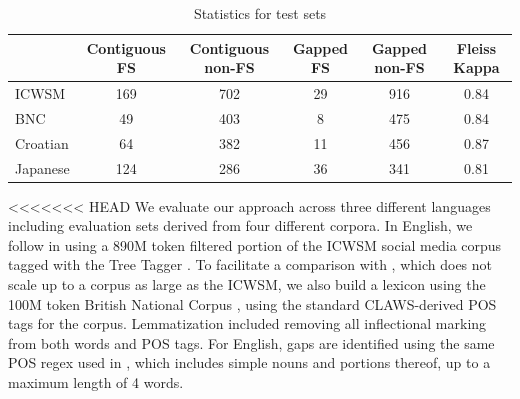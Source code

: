 \documentclass[11pt,letterpaper]{article}
\begin{document}
\begin{table}[!bt]
 
 \begin{center}
  \caption{ Statistics for test sets}
	 \label{tab:stats}
	 \begin{tabular}{lccccc}

       \hline
			& Contiguous FS & Contiguous non-FS & Gapped FS & Gapped non-FS & Fleiss Kappa\\
			 \hline
			ICWSM & 169 & 702 & 29 & 916& 0.84 \\
			BNC & 49 & 403 & 8 & 475 & 0.84 \\
			Croatian & 64 & 382 & 11 & 456 & 0.87 \\
			Japanese & 124 & 286 & 36 & 341 & 0.81\\
       \hline
 \end{tabular}

 \end{center}

 \end{table}	


<<<<<<< HEAD
We evaluate our approach across three different languages including evaluation sets derived from four different corpora. In English, we follow  in using a 890M token filtered portion of the ICWSM social media corpus \cite{ICWSM} tagged with the Tree Tagger \cite{Schmid95}. To facilitate a comparison with , which does not scale up to a corpus as large as the ICWSM, we also build a lexicon using the 100M token British National Corpus \cite{BNC}, using the standard CLAWS-derived POS tags for the corpus. Lemmatization included removing all inflectional marking from both words and POS tags. For English, gaps are identified using the same POS regex used in , which includes simple nouns and portions thereof, up to a maximum length of 4 words.
\end{document}
